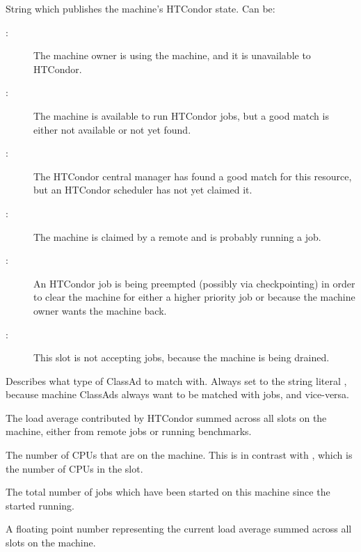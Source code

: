 \begin{description}
%
\item[\AdAttr{State}:] String which publishes the machine's HTCondor state.
Can be:
	\begin{description}
	\item[:] The machine owner is using the machine, and
it is unavailable to HTCondor.
	\item[:] The machine is available to run HTCondor jobs,
but a good match is either not available or not 
yet found.
	\item[:] The HTCondor central manager has found a good
match for this resource, but an HTCondor scheduler has not yet claimed it.
	\item[:] The machine is claimed by a remote
 and is probably running a job.
	\item[:] An HTCondor job is being preempted (possibly
via checkpointing) in order to clear the machine for either a higher
priority job or because the machine owner wants the machine back.
	\item[:] This slot is not accepting jobs,
because the machine is being drained.
	\end{description}   %
%
\item[\AdAttr{TargetType}:] Describes what type of ClassAd to match with.
Always set to the string literal , because machine ClassAds
always want to be matched with jobs, and vice-versa.
%
\item[\AdAttr{TotalCondorLoadAvg}:] The load average contributed  
by HTCondor summed across all slots on the machine, 
either from remote jobs or running benchmarks.
%
\item[\AdAttr{TotalCpus}:] The number of CPUs that are on the machine.
This is in contrast with ,
which is the number of CPUs in the slot.
%
\item[\AdAttr{TotalJobStarts}:] The total number of jobs which 
have been started on this machine since the  started running.
%
\item[\AdAttr{TotalLoadAvg}:] A floating point number representing the 
current load average summed across all slots on the machine.
%

\end{description}
